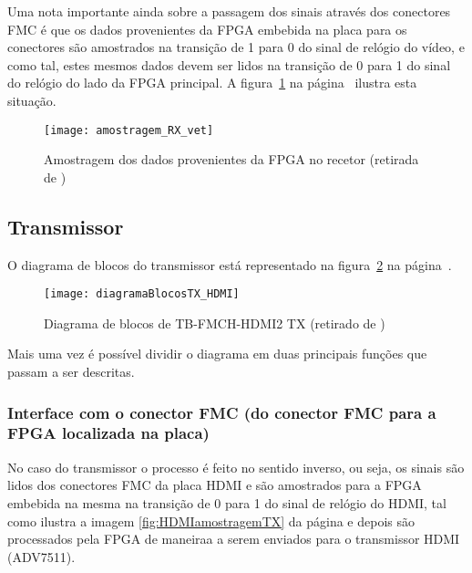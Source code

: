 Uma nota importante ainda sobre a passagem dos sinais através dos conectores FMC é que os dados provenientes da FPGA embebida na placa para os conectores são amostrados na transição de 1 para 0 do sinal de relógio do vídeo, e como tal, estes mesmos dados devem ser lidos na transição de 0 para 1 do sinal do relógio do lado da FPGA principal. A figura~\ref{fig:HDMIamostragemRX} na página~\pageref{fig:HDMIamostragemRX} ilustra esta situação.

\begin{figure}[h!]
	\begin{center}
		\leavevmode
		\texttt{[image: amostragem\_RX\_vet]}
		\caption[Amostragem dos dados provenientes da FPGA no recetor]{Amostragem dos dados provenientes da FPGA no recetor (retirada de \cite{R009})}
		\label{fig:HDMIamostragemRX}
	\end{center}
\end{figure}
 


\subsection{Transmissor}\label{subsec:TX} 

O diagrama de blocos do transmissor está representado na figura~\ref{fig:HDMIblocosTX} na página~\pageref{fig:HDMIblocosTX}.
\begin{figure}[h!]
	\begin{center}
		\leavevmode
		\texttt{[image: diagramaBlocosTX\_HDMI]}
		\caption[Diagrama de blocos de TB-FMCH-HDMI2 TX]{Diagrama de blocos de TB-FMCH-HDMI2 TX (retirado de \cite{R009})}
		\label{fig:HDMIblocosTX}
	\end{center}
\end{figure}
Mais uma vez é possível dividir o diagrama em duas principais funções que passam a ser descritas.

\subsubsection{Interface com o conector FMC (do conector FMC para a FPGA localizada na placa)}
No caso do transmissor o processo é feito no sentido inverso, ou seja, os sinais são lidos dos conectores FMC da placa HDMI e são amostrados para a FPGA embebida na mesma na transição de 0 para 1 do sinal de relógio do HDMI, tal como ilustra a imagem \ref{fig:HDMIamostragemTX} da página \pageref{fig:HDMIamostragemTX} e depois são processados pela FPGA de maneiraa a serem enviados para o transmissor HDMI (ADV7511).

